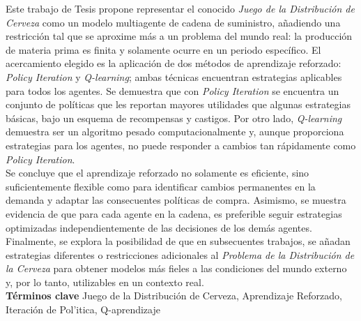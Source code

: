 
Este trabajo de Tesis propone representar el conocido \textit{Juego de la Distribuci\'on de Cerveza} como un modelo multiagente de cadena de suministro, a\~nadiendo una restricci\'on tal que se aproxime m\'as a un problema del mundo real: la producci\'on de materia prima es finita y solamente ocurre en un periodo espec\'ifico. El acercamiento elegido es la aplicaci\'on de dos m\'etodos de aprendizaje reforzado: \textit{Policy Iteration} y \textit{Q-learning}; ambas t\'ecnicas encuentran estrategias aplicables para todos los agentes. Se demuestra que con \textit{Policy Iteration} se encuentra un conjunto de pol\'iticas que les reportan mayores utilidades que algunas estrategias b\'asicas, bajo un esquema de recompensas y castigos. Por otro lado, \textit{Q-learning} demuestra ser un algoritmo pesado computacionalmente y, aunque proporciona estrategias para los agentes, no puede responder a cambios tan r\'apidamente como \textit{Policy Iteration}.\\

Se concluye que el aprendizaje reforzado no solamente es eficiente, sino suficientemente flexible como para identificar cambios permanentes en la demanda y adaptar las consecuentes pol\'iticas de compra. Asimismo, se muestra evidencia de que para cada agente en la cadena, es preferible seguir estrategias optimizadas independientemente de las decisiones de los dem\'as agentes. Finalmente, se explora la posibilidad de que en subsecuentes trabajos, se a\~nadan estrategias diferentes o restricciones adicionales al \textit{Problema de la Distribuci\'on de la Cerveza} para obtener modelos m\'as fieles a las condiciones del mundo externo y, por lo tanto, utilizables en un contexto real.\\

\textbf{T\'erminos clave}
Juego de la Distribuci\'on de Cerveza, Aprendizaje Reforzado, Iteraci\'on de Pol'itica, Q-aprendizaje
